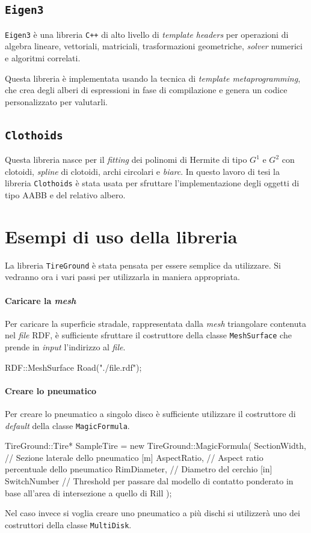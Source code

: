 \subsection{\texttt{Eigen3}}
\texttt{Eigen3} è una libreria \texttt{C++} di alto livello di \textit{template headers} per operazioni di algebra lineare, vettoriali, matriciali, trasformazioni geometriche, \textit{solver} numerici e algoritmi correlati.

Questa libreria è implementata usando la tecnica di \textit{template metaprogramming}, che crea degli alberi di espressioni in fase di compilazione e genera un codice personalizzato per valutarli.
%
\subsection{\texttt{Clothoids}}
Questa libreria nasce per il \textit{fitting} dei polinomi di Hermite di tipo $G^1$ e $G^2$ con clotoidi, \textit{spline} di clotoidi, archi circolari e \textit{biarc}. In questo lavoro di tesi la libreria \texttt{Clothoids} è stata usata per sfruttare l'implementazione degli oggetti di tipo \ac{AABB} e del relativo albero.
%
\section{Esempi di uso della libreria}
La libreria \texttt{TireGround} è stata pensata per essere semplice da utilizzare. Si vedranno ora i vari passi per utilizzarla in maniera appropriata.
%
\paragraph{Caricare la \textit{mesh}}
Per caricare la superficie stradale, rappresentata dalla \textit{mesh} triangolare contenuta nel \textit{file} \ac{RDF}, è sufficiente sfruttare il costruttore della classe \texttt{MeshSurface} che prende in \textit{input} l'indirizzo al \textit{file}.
\begin{pseudoc}
	RDF::MeshSurface Road("./file.rdf");
\end{pseudoc}
%
\paragraph{Creare lo pneumatico}
Per creare lo pneumatico a singolo disco è sufficiente utilizzare il costruttore di \textit{default} della classe \texttt{MagicFormula}.
\begin{pseudoc}
	TireGround::Tire* SampleTire = new TireGround::MagicFormula(
		SectionWidth, // Sezione laterale dello pneumatico [m]
		AspectRatio,  // Aspect ratio percentuale dello pneumatico
		RimDiameter,  // Diametro del cerchio [in]
		SwitchNumber  // Threshold per passare dal modello di contatto ponderato in base all'area di intersezione a quello di Rill 
		);
\end{pseudoc}
Nel caso invece si voglia creare uno pneumatico a più dischi si utilizzerà uno dei costruttori della classe \texttt{MultiDisk}.

